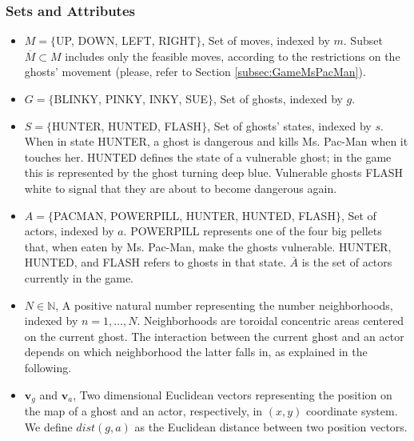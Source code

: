 \documentclass[journal]{IEEEtran}
\begin{document}
\subsubsection{Sets and Attributes}
\begin{itemize}
  \item $M=\{$UP, DOWN, LEFT, RIGHT$\}$, Set of moves, indexed by $m$. Subset $\overline{M}\subset M$ includes only the feasible moves, according to the restrictions on the ghosts' movement (please, refer to Section \ref{subsec:GameMsPacMan}).
  \item $G=\{$BLINKY, PINKY, INKY, SUE$\}$, Set of ghosts, indexed by $g$.
  \item $S=\{$HUNTER, HUNTED, FLASH$\}$, Set of ghosts' states, indexed by $s$. When in state HUNTER, a ghost is dangerous and kills Ms. Pac-Man when it touches her. HUNTED defines the state of a vulnerable ghost; in the game this is represented by the ghost turning deep blue. Vulnerable ghosts FLASH white to signal that they are about to become dangerous again.
  \item $A=\{$PACMAN, POWERPILL, HUNTER, HUNTED, FLASH$\}$, Set of actors, indexed by $a$. POWERPILL represents one of the four big pellets that, when eaten by Ms. Pac-Man, make the ghosts vulnerable. HUNTER, HUNTED, and FLASH refers to ghosts in that state. $\overline{A}$ is the set of actors currently in the game.
  \item $N \in \mathbb{N}$, A positive natural number representing the number neighborhoods, indexed by $n = 1, \ldots, N$. Neighborhoods are toroidal concentric areas centered on the current ghost. The interaction between the current ghost and an actor depends on which neighborhood the latter falls in, as explained in the following.
  \item $\mathbf{v}_g$ and $\mathbf{v}_a$, Two dimensional Euclidean vectors representing the position on the map of a ghost and an actor, respectively, in $(x,y)$ coordinate system. We define $dist(g,a)$ as the Euclidean distance between two position vectors.
\end{itemize}
\end{document}
